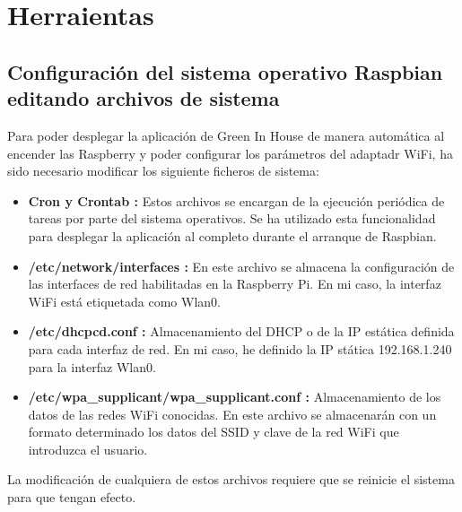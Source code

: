 
\section{Herraientas}

    \subsection{Configuración del sistema operativo Raspbian editando archivos de sistema}
    Para poder desplegar la aplicación de Green In House de manera automática al encender las Raspberry y poder configurar los parámetros del adaptadr WiFi, ha sido necesario modificar los siguiente ficheros de sistema: 
    \begin{itemize}
        \item \textbf{Cron y Crontab : } Estos archivos se encargan de la ejecución periódica de tareas por parte del sistema operativos. Se ha utilizado esta funcionalidad para desplegar la aplicación al completo durante el arranque de Raspbian.       
        \item \textbf{/etc/network/interfaces : } En este archivo se almacena la configuración de las interfaces de red habilitadas en la Raspberry Pi. En mi caso, la interfaz WiFi está etiquetada como Wlan0.
        \item \textbf{/etc/dhcpcd.conf : } Almacenamiento del DHCP o de la IP estática definida para cada interfaz de red. En mi caso, he definido la IP stática 192.168.1.240 para la interfaz Wlan0.
        \item \textbf{/etc/wpa\_supplicant/wpa\_supplicant.conf : } Almacenamiento de los datos de las redes WiFi conocidas. En este archivo se almacenarán con un formato determinado los datos del SSID y clave de la red WiFi que introduzca el usuario.  
    \end{itemize}
    La modificación de cualquiera de estos archivos requiere que se reinicie el sistema para que tengan efecto.


